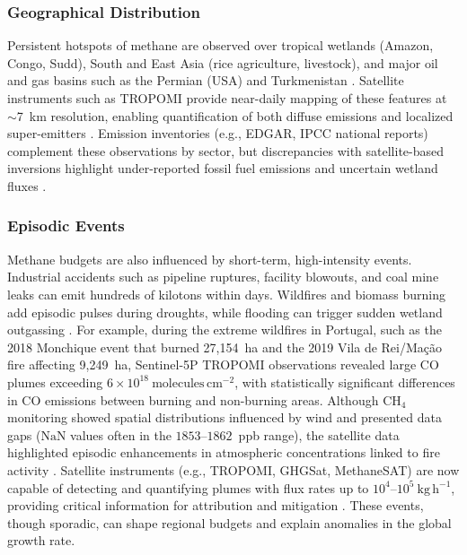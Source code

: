 \subsubsection{Geographical Distribution} 
Persistent hotspots of methane are observed over tropical wetlands (Amazon, Congo, Sudd), South and East Asia (rice agriculture, livestock), and major oil and gas basins such as the Permian (USA) and Turkmenistan \cite{irakulis_loitxate_satellites_2022, Zhang2020}. Satellite instruments such as TROPOMI provide near-daily mapping of these features at $\sim$7~km resolution, enabling quantification of both diffuse emissions and localized super-emitters \cite{Jacob2022, Lorente2021}. Emission inventories (e.g., EDGAR, IPCC national reports) complement these observations by sector, but discrepancies with satellite-based inversions highlight under-reported fossil fuel emissions and uncertain wetland fluxes \cite{Saunois2020}.

\subsubsection{Episodic Events} 
Methane budgets are also influenced by short-term, high-intensity events. Industrial accidents such as pipeline ruptures, facility blowouts, and coal mine leaks can emit hundreds of kilotons within days. Wildfires and biomass burning add episodic pulses during droughts, while flooding can trigger sudden wetland outgassing \cite{Pandey2017, Lauvaux2022}. For example, during the extreme wildfires in Portugal, such as the 2018 Monchique event that burned 27{,}154~ha and the 2019 Vila de Rei/Ma\c c\~ao fire affecting 9{,}249~ha, Sentinel-5P TROPOMI observations revealed large CO plumes exceeding $6 \times 10^{18}\ \mathrm{molecules}\,\mathrm{cm}^{-2}$, with statistically significant differences in CO emissions between burning and non-burning areas. Although CH$_4$ monitoring showed spatial distributions influenced by wind and presented data gaps ($\mathrm{NaN}$ values often in the $1853$--$1862$~ppb range), the satellite data highlighted episodic enhancements in atmospheric concentrations linked to fire activity \cite{portugal_fire_2021}. Satellite instruments (e.g., TROPOMI, GHGSat, MethaneSAT) are now capable of detecting and quantifying plumes with flux rates up to $10^{4}$--$10^{5}\ \mathrm{kg}\,\mathrm{h}^{-1}$, providing critical information for attribution and mitigation \cite{Varon2019, Varon2020, Guanter2021, Sherwin2024}. These events, though sporadic, can shape regional budgets and explain anomalies in the global growth rate.

